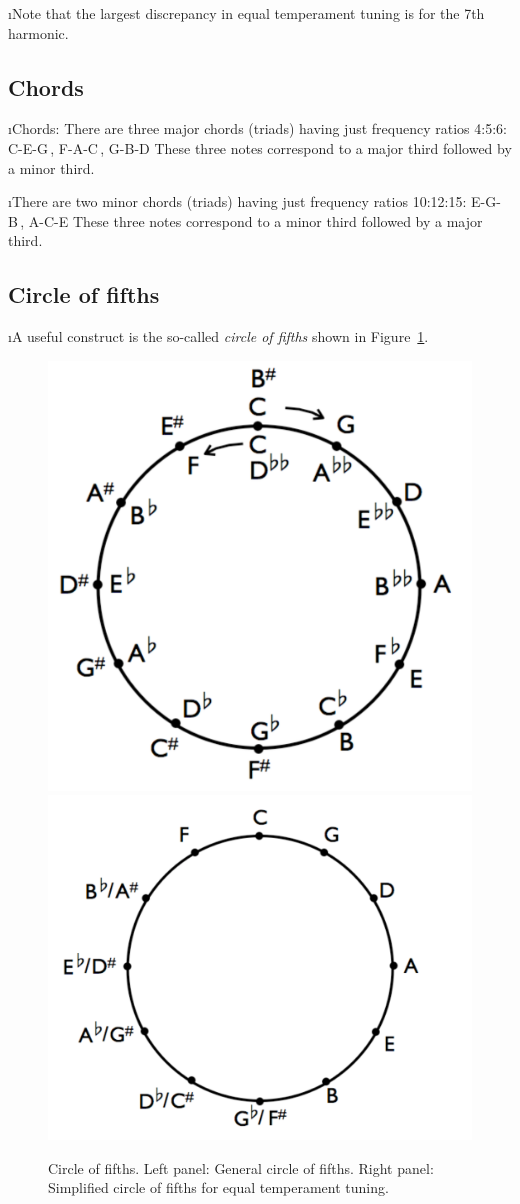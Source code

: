 \i Note that the largest discrepancy in equal temperament
tuning is for the 7th harmonic.

\ei
\subsection{Chords}
\bi

\i Chords: There are three major chords (triads) 
having just frequency ratios 4:5:6:
%
\be
{\rm C-E-G}\,,
\quad
{\rm F-A-C}\,,
\quad
{\rm G-B-D}
\nonumber
\ee
%
These three notes correspond to a major third followed by a minor third.

\i There are two minor chords (triads) 
having just frequency ratios 10:12:15:
%
\be
{\rm E-G-B}\,,
\quad
{\rm A-C-E}
\nonumber
\ee
%
These three notes correspond to a minor third followed by a major third.

\ei
\subsection{Circle of fifths}
\bi

\i A useful construct is the so-called {\em circle of fifths}
shown in Figure~\ref{f:circle-of-fifths}.

\begin{figure}[htbp]
\begin{center}
\includegraphics[width=.4\textwidth]{circle-of-fifths}
\includegraphics[width=.5\textwidth]{circle-of-fifths-simple}
\caption{Circle of fifths.
Left panel: General circle of fifths.
Right panel: Simplified circle of fifths for equal temperament tuning.}
\label{f:circle-of-fifths}
\end{center}
\end{figure}

